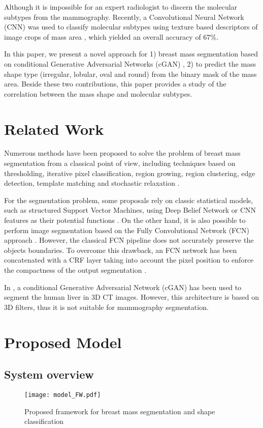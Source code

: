 \documentclass[runningheads,a4paper]{llncs}
\begin{document}
Although it is impossible for an expert radiologist to discern the molecular subtypes from the mammography. Recently, a Convolutional Neural Network (CNN) was used to classify molecular subtypes using texture based descriptors of image crops of mass area \cite{Singh17CCIA}, which yielded an overall accuracy of $67\%$.

In this paper, we present a novel approach for 1) breast mass segmentation based on conditional Generative Adversarial Networks (cGAN) \cite{isola2017image}, 2) to predict the mass shape type (irregular, lobular, oval and round) from the binary mask of the mass area. Beside these two contributions, this paper provides a study of the correlation between the mass shape and molecular subtypes.

\section{Related Work}

Numerous methods have been proposed to solve the problem of breast mass segmentation from a classical point of view, including techniques based on thresholding, iterative pixel classification, region growing, region clustering, edge detection, template matching and stochastic relaxation \cite{ChengSMHCD06,oliver2010review}.

For the segmentation problem, some proposals rely on classic statistical models, such as structured Support Vector Machines, using Deep Belief Network or CNN features as their potential functions \cite{dhungel2015deep}. On the other hand, it is also possible to perform image segmentation based on the Fully Convolutional Network (FCN) approach \cite{long2015fully}. However, the classical FCN pipeline does not accurately preserve the objects boundaries. To overcome this drawback, an FCN network has been concatenated with a CRF layer taking into account the pixel position to enforce the compactness of the output segmentation \cite{zhu2016adversarial}.

In \cite{yang2017automatic}, a conditional Generative Adversarial Network (cGAN) has been used to segment the human liver in 3D CT images. However, this architecture is based on 3D filters, thus it is not suitable for mammography segmentation.


\section{Proposed Model}

\subsection{System overview}
\begin{figure}[!h]
\centering
\texttt{[image: model\_FW.pdf]}
\caption{Proposed framework for breast mass segmentation and shape classification}
\label{fig1:model}
\end{figure}
\end{document}
